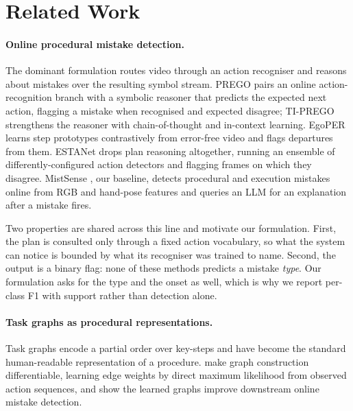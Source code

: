 \documentclass[10pt,twocolumn]{article}
\begin{document}
\section{Related Work}
\label{sec:related}

\paragraph{Online procedural mistake detection.}
The dominant formulation routes video through an action recogniser and reasons
about mistakes over the resulting symbol stream. PREGO
\citep{flaborea2024prego} pairs an online action-recognition branch with a
symbolic reasoner that predicts the expected next action, flagging a mistake
when recognised and expected disagree; TI-PREGO \citep{plini2024tiprego}
strengthens the reasoner with chain-of-thought and in-context learning. EgoPER
\citep{lee2024egoper} learns step prototypes contrastively from error-free video
and flags departures from them. ESTANet \citep{lee2026estanet} drops plan
reasoning altogether, running an ensemble of differently-configured action
detectors and flagging frames on which they disagree. MistSense
\citep{patsch2025mistsense}, our baseline, detects procedural and execution
mistakes online from RGB and hand-pose features and queries an LLM for an
explanation after a mistake fires.

Two properties are shared across this line and motivate our formulation. First,
the plan is consulted only through a fixed action vocabulary, so what the system
can notice is bounded by what its recogniser was trained to name. Second, the
output is a binary flag: none of these methods predicts a mistake \emph{type}.
Our formulation asks for the type and the onset as well, which is why we report
per-class F1 with support rather than detection alone.

\paragraph{Task graphs as procedural representations.}
Task graphs encode a partial order over key-steps and have become the standard
human-readable representation of a procedure.
\citet{seminara2024taskgraph} make graph construction differentiable, learning
edge weights by direct maximum likelihood from observed action sequences, and
show the learned graphs improve downstream online mistake detection.
\end{document}
